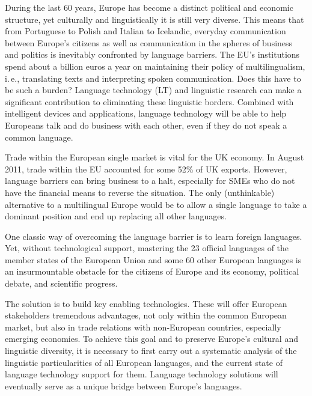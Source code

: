 \documentclass[]{../../metanetpaper}
\begin{document}
\begin{multicols}{2}

During the last 60 years, Europe has become a distinct political and economic structure, yet culturally and linguistically it is still very diverse. This means that from Portuguese to Polish and Italian to Icelandic, everyday communication between Europe's citizens as well as communication in the spheres of business and politics is inevitably confronted by language barriers. The EU's institutions spend about a billion euros a year on maintaining their policy of multilingualism, i.\,e., translating texts and interpreting spoken communication. Does this have to be such a burden? Language technology (LT) and linguistic research can make a significant contribution to eliminating these linguistic borders. Combined with intelligent devices and applications, language technology will be able to help Europeans talk and do business with each other, even if they do not speak a common language. 


Trade within the European single market is vital for the UK economy. In August 2011, trade within the EU accounted for some 52\% of UK exports. However, language barriers can bring business to a halt, especially for SMEs who do not have the financial means to reverse the situation. The only (unthinkable) alternative to a multilingual Europe would be to allow a single language to take a dominant position and end up replacing all other languages. 
    
One classic way of overcoming the language barrier is to learn foreign languages. Yet, without technological support, mastering the 23 official languages of the member states of the European Union and some 60 other European languages is an insurmountable obstacle for the citizens of Europe and its economy, political debate, and scientific progress.   
    
The solution is to build key enabling technologies. These will offer European stakeholders tremendous advantages, not only within the common European market, but also in trade relations with non-European countries, especially emerging economies.  To achieve this goal and to preserve Europe's cultural and linguistic diversity, it is necessary to first carry out a systematic analysis of the linguistic particularities of all European languages, and the current state of language technology support for them. Language technology solutions will eventually serve as a unique bridge between Europe's languages. 


\end{multicols}
\end{document}
